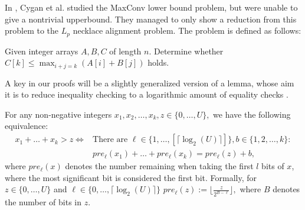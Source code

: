       In \cite {DBLP:journals/talg/CyganMWW19}, Cygan et al. studied the MaxConv lower bound problem, but were unable to give a nontrivial upperbound.
      They managed to only show a reduction from this problem to the $L_p$ necklace alignment problem.
      The problem is defined as follows:
      \begin{definition}
      \label{def:maxconvlb}
      Given integer arrays $A,B,C$ of length $n$. Determine whether 
      $C[k] \leq \max_{i+j=k} (A[i]+B[j])$ holds.
      \end{definition}


A key in our proofs will be a slightly generalized version of a lemma, whose aim it is to reduce inequality checking to a logarithmic amount of equality checks \cite{DBLP:journals/siamcomp/WilliamsW13}. 
\begin{lemma}
  For any non-negative integers $x_1,x_2, \dots, x_k, z \in \{0,\dots,U\},$ we have the following equivalence:
  \begin{align*}
      x_1+ \dots +x_k >z \iff & \text{There are } \ell \in \{1,\dots, [\lceil \log_2(U) \rceil] \}, b\in \{1,2, \dots, k\}:\\
      & pre_\ell(x_1)+\dots +pre_\ell(x_k)=pre_\ell(z)+b,
  \end{align*}
  where $pre_\ell(x)$ denotes the number remaining when taking the first $l$ bits of $x$, where the most significant bit is considered the first bit. Formally, for $z \in \{0,\dots,U\}$ and $\ell \in \{0,\dots, \lceil \log_2(U) \rceil\}$ $pre_\ell(z):=\lfloor \frac{z}{2^{B-\ell}} \rfloor,$ where $B$ denotes the number of bits in $z$.
  \label{bit_trick}
  \end{lemma}

